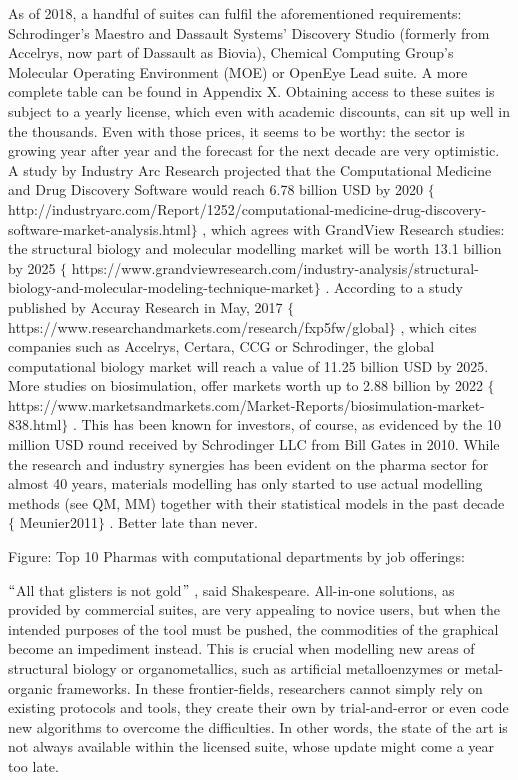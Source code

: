 As of 2018, a handful of suites can fulfil the aforementioned requirements: Schrodinger’s Maestro and Dassault Systems’ Discovery Studio (formerly from Accelrys, now part of Dassault as Biovia), Chemical Computing Group’s Molecular Operating Environment (MOE) or OpenEye Lead suite. A more complete table can be found in Appendix X. Obtaining access to these suites is subject to a yearly license, which even with academic discounts, can sit up well in the thousands. Even with those prices, it seems to be worthy: the sector is growing year after year and the forecast for the next decade are very optimistic. A study by Industry Arc Research projected that the Computational Medicine and Drug Discovery Software would reach 6.78 billion USD by 2020 $ \{ $ http://industryarc.com/Report/1252/computational-medicine-drug-discovery-software-market-analysis.html$ \} $ , which agrees with GrandView Research studies: the structural biology and molecular modelling market will be worth 13.1 billion by 2025 $ \{ $ https://www.grandviewresearch.com/industry-analysis/structural-biology-and-molecular-modeling-technique-market$ \} $ . According to a study published by Accuray Research in May, 2017 $ \{ $ https://www.researchandmarkets.com/research/fxp5fw/global$ \} $ , which cites companies such as Accelrys, Certara, CCG or Schrodinger, the global computational biology market will reach a value of 11.25 billion USD by 2025. More studies on biosimulation, offer markets worth up to 2.88 billion by 2022 $ \{ $ https://www.marketsandmarkets.com/Market-Reports/biosimulation-market-838.html$ \} $ . This has been known for investors, of course, as evidenced by the 10 million USD round received by Schrodinger LLC from Bill Gates in 2010. While the research and industry synergies has been evident on the pharma sector for almost 40 years, materials modelling has only started to use actual modelling methods (see QM, MM) together with their statistical models in the past decade $ \{ $ Meunier2011$ \} $ . Better late than never.

Figure: Top 10 Pharmas with computational departments by job offerings:

$``$All that glisters is not gold$"$ , said Shakespeare. All-in-one solutions, as provided by commercial suites, are very appealing to novice users, but when the intended purposes of the tool must be pushed, the commodities of the graphical become an impediment instead. This is crucial when modelling new areas of structural biology or organometallics, such as artificial metalloenzymes or metal-organic frameworks. In these frontier-fields, researchers cannot simply rely on existing protocols and tools, they create their own by trial-and-error or even code new algorithms to overcome the difficulties. In other words, the state of the art is not always available within the licensed suite, whose update might come a year too late.

